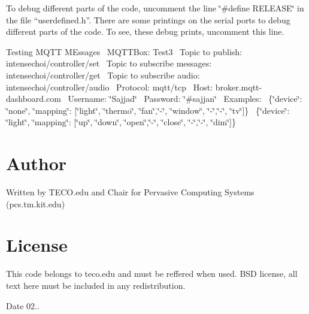 \begin{DoxyEnumerate}
\item To debug different parts of the code, uncomment the line \char`\"{}\#define R\+E\+L\+E\+A\+S\+E\char`\"{} in the file “userdefined.\+h”. There are some printings on the serial ports to debug different parts of the code. To see, these debug prints, uncomment this line.~\newline

\item Testing M\+Q\+TT M\+Essages~\newline
M\+Q\+T\+T\+Box\+: Test3~\newline
Topic to publish\+: intensechoi/controller/set~\newline
Topic to subscribe messages\+: intensechoi/controller/get~\newline
Topic to subscribe audio\+: intensechoi/controller/audio~\newline
Protocol\+: mqtt/tcp~\newline
Host\+: broker.\+mqtt-\/dashboard.\+com~\newline
Username\+: \char`\"{}\+Sajjad\char`\"{}~\newline
Password\+: \char`\"{}\#sajjan\char`\"{}~\newline
Examples\+:~\newline
 \{\char`\"{}device\char`\"{}\+: \char`\"{}none\char`\"{}, \char`\"{}mapping\char`\"{}\+: \mbox{[}\char`\"{}light\char`\"{}, \char`\"{}thermo\char`\"{}, \char`\"{}fan\char`\"{},\char`\"{}-\/\char`\"{}, \char`\"{}window\char`\"{}, \char`\"{}-\/\char`\"{},\char`\"{}-\/\char`\"{}, \char`\"{}tv\char`\"{}\mbox{]}\}~\newline
 \{\char`\"{}device\char`\"{}\+: \char`\"{}light\char`\"{}, \char`\"{}mapping\char`\"{}\+: \mbox{[}\char`\"{}up\char`\"{}, \char`\"{}down\char`\"{}, \char`\"{}open\char`\"{},\char`\"{}-\/\char`\"{}, \char`\"{}close\char`\"{}, \char`\"{}-\/\char`\"{},\char`\"{}-\/\char`\"{}, \char`\"{}dim\char`\"{}\mbox{]}\}~\newline
 
\end{DoxyEnumerate}\hypertarget{index_author}{}\section{Author}\label{index_author}
Written by T\+E\+C\+O.\+edu and Chair for Pervasive Computing Systems (pcs.\+tm.\+kit.\+edu)\hypertarget{index_license}{}\section{License}\label{index_license}
This code belongs to teco.\+edu and must be reffered when used. B\+SD license, all text here must be included in any redistribution.

\begin{DoxyDate}{Date}
02.. 
\end{DoxyDate}
